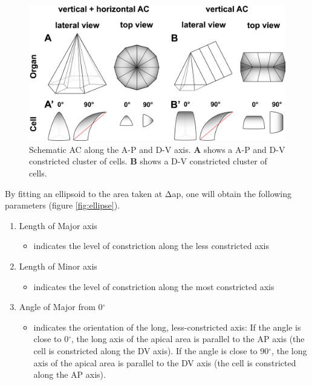 \documentclass[10pt, b5paper, singlespacinge, twoside]{reedthesis} %
\providecommand{\tightlist}{%
  \setlength{\itemsep}{0pt}\setlength{\parskip}{0pt}}
\theoremstyle{definition}
\theoremstyle{definition}
\theoremstyle{definition}
\theoremstyle{remark}
\begin{document}
\begin{figure}[H]

{\centering \includegraphics[width=0.75\linewidth]{figures/materials/models/ACI_Cells_pol} 

}

\caption[Schematic anisotropic AC]{Schematic AC along the A-P and D-V axis. \textbf{A} shows a A-P and D-V constricted cluster of cells. \textbf{B} shows a D-V constricted cluster of cells.}\label{fig:cellpol}
\end{figure}
\noindent By fitting an ellipsoid to the area taken at \(\mathrm{\Delta}\)ap, one will obtain the following parameters (figure \ref{fig:ellipse}).
\begin{enumerate}
\def\labelenumi{\arabic{enumi}.}
\tightlist
\item
  Length of Major axis
  \begin{itemize}
  \tightlist
  \item
    indicates the level of constriction along the less constricted axis
  \end{itemize}
\item
  Length of Minor axis
  \begin{itemize}
  \tightlist
  \item
    indicates the level of constriction along the most constricted axis
  \end{itemize}
\item
  Angle of Major from 0\(^\circ\)
  \begin{itemize}
  \tightlist
  \item
    indicates the orientation of the long, less-constricted axis: If the angle is close to 0\(^\circ\), the long axis of the apical area is parallel to the AP axis (the cell is constricted along the DV axis). If the angle is close to 90\(^\circ\), the long axis of the apical area is parallel to the DV axis (the cell is constricted along the AP axis).
  \end{itemize}
\end{enumerate}
\end{document}
